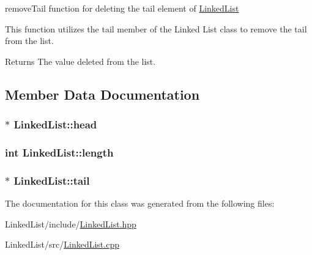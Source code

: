remove\-Tail function for deleting the tail element of \hyperlink{classLinkedList}{\-Linked\-List} 

\-This function utilizes the tail member of the \-Linked \-List class to remove the tail from the list.

\begin{DoxyReturn}{\-Returns}
\-The value deleted from the list. 
\end{DoxyReturn}


\subsection{\-Member \-Data \-Documentation}
\hypertarget{classLinkedList_a3b496be2ca8046e2a806f6e2eab33d9b}{
\subsubsection[{head}]{$\ast$ {\bf \-Linked\-List\-::head}}}\label{classLinkedList_a3b496be2ca8046e2a806f6e2eab33d9b}
\hypertarget{classLinkedList_a0ee3b52ce8c1297315a78a59de6aba24}{
\subsubsection[{length}]{\setlength{\rightskip}{0pt plus 5cm}int {\bf \-Linked\-List\-::length}}}\label{classLinkedList_a0ee3b52ce8c1297315a78a59de6aba24}
\hypertarget{classLinkedList_a6ee7e26362fba74cdec9d4806ded2a21}{
\subsubsection[{tail}]{$\ast$ {\bf \-Linked\-List\-::tail}}}\label{classLinkedList_a6ee7e26362fba74cdec9d4806ded2a21}


\-The documentation for this class was generated from the following files\-:\begin{DoxyCompactItemize}
\item 
\-Linked\-List/include/\hyperlink{LinkedList_8hpp}{\-Linked\-List.\-hpp}\item 
\-Linked\-List/src/\hyperlink{LinkedList_8cpp}{\-Linked\-List.\-cpp}\end{DoxyCompactItemize}
